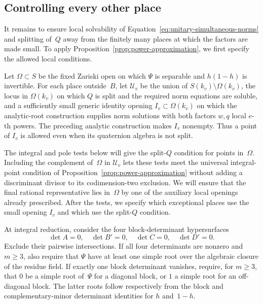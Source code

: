 \subsection{Controlling every other place}

It remains to ensure local solvability of
Equation~\eqref{eq:unitary-simultaneous-norms} and splitting of~$Q$
away from the finitely many places at which the factors are made
small.  To apply Proposition~\ref{prop:power-approximation}, we first
specify the allowed local conditions.

Let $\Omega\subset S$ be the fixed Zariski open on which $\Psi$ is
separable and $h(1-h)$ is invertible.  For each place outside~$B$,
let $\mathcal U_v$ be the union of $S(k_v)\setminus\Omega(k_v)$,
the locus in $\Omega(k_v)$ on which $Q$ is split and the required
norm equations are soluble, and a sufficiently small generic
identity opening $I_v\subset\Omega(k_v)$ on which the analytic-root
construction supplies norm solutions with both factors $w,q$ local
$e$-th powers.  The preceding analytic construction makes $I_v$
nonempty.  Thus a point of $I_v$ is allowed even when its quaternion
algebra is not split.

The integral and pole tests below will give the split-$Q$ condition
for points in~$\Omega$.  Including the complement of~$\Omega$ in
$\mathcal U_v$ lets these tests meet the universal integral-point
condition of Proposition~\ref{prop:power-approximation} without adding
a discriminant divisor to its codimension-two exclusion.  We will
ensure that the final rational representative lies in~$\Omega$ by
one of the auxiliary local openings already prescribed.  After the
tests, we specify which exceptional places use the small opening
$I_v$ and which use the split-$Q$ condition.

At integral reduction, consider the four block-determinant
hypersurfaces
\[
 \det A=0,\quad\det B'=0,\quad\det C=0,\quad\det D'=0.
\]
Exclude their pairwise intersections.  If all four determinants are
nonzero and $m\geq3$, also require that $\Psi$ have at least one
simple root over the algebraic closure of the residue field.  If
exactly one block determinant vanishes, require, for $m\geq3$, that
$0$ be a simple root of~$\Psi$ for a diagonal block, or $1$ a simple
root for an off-diagonal block.  The latter roots follow respectively
from the block and complementary-minor determinant identities for
$h$ and~$1-h$.

